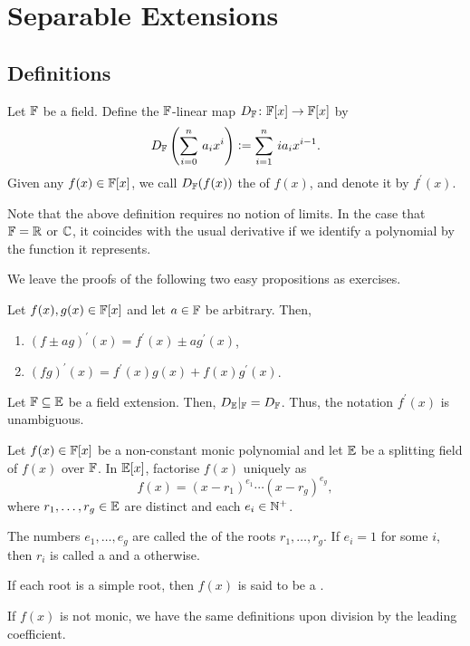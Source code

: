 \section{Separable Extensions}

\subsection{Definitions}

\begin{defn} \label{defn:derivative}
    Let $\mathbb{F}$ be a field. Define the $\mathbb{F}$-linear map $D_{\mathbb{F}} \colon \mathbb{F}[x] \to \mathbb{F}[x]$ by
    \[
        D_{\mathbb{F}} \left( \sum_{i=0}^n \, a_i x^i \right) \vcentcolon= \sum_{i=1}^n \, i a_i x^{i-1}.
    \]
    Given any $f(x) \in \mathbb{F}[x]$, we call $D_{\mathbb{F}}(f(x))$ the  of $f(x)$, and denote it by $f^{\prime}(x)$.
\end{defn}

\begin{rem}
    Note that the above definition requires no notion of limits. In the case that $\mathbb{F} = \mathbb{R}$ or $\mathbb{C}$, it coincides with the usual derivative if we identify a polynomial by the function it represents.
\end{rem}

We leave the proofs of the following two easy propositions as exercises. 

\begin{prop}
    Let $f(x),g(x) \in \mathbb{F}[x]$ and let $a \in \mathbb{F}$ be arbitrary. Then, 
    \begin{enumerate}
        \item $(f\pm ag)^{\prime}(x) = f^{\prime}(x) \pm ag^{\prime}(x)$,
        \item $(fg)^{\prime}(x) = f^{\prime}(x)g(x) + f(x)g^{\prime}(x)$.
    \end{enumerate}
\end{prop}
\begin{prop}
    Let $\mathbb{F} \subseteq \mathbb{E}$ be a field extension. Then, $D_{\mathbb{E}} |_{\mathbb{F}} = D_{\mathbb{F}}$. Thus, the notation $f^{\prime}(x)$ is unambiguous. 
\end{prop}

\begin{defn}
    Let $f(x) \in \mathbb{F}[x]$ be a non-constant monic polynomial and let $\mathbb{E}$ be a splitting field of $f(x)$ over $\mathbb{F}$. In $\mathbb{E}[x]$, factorise $f(x)$ uniquely as
    \[
        f(x) = (x-r_1)^{e_1} \cdots (x-r_g)^{e_g},
    \]
    where $r_1,\ldots,r_g \in \mathbb{E}$ are distinct and each $e_i \in \mathbb{N}^+$.
    
    The numbers $e_1,\ldots,e_g$ are called the  of the roots $r_1,\ldots,r_g$. If $e_i = 1$ for some $i$, then $r_i$ is called a  and a  otherwise.
    
    If each root is a simple root, then $f(x)$ is said to be a .
    
    If $f(x)$ is not monic, we have the same definitions upon division by the leading coefficient.
\end{defn}

